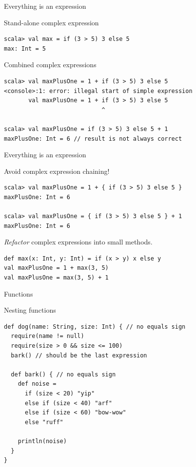 \begin{frame}[fragile]{Everything is an expression}
\begin{exampleblock}{Stand-alone complex expression }
\begin{lstlisting}
scala> val max = if (3 > 5) 3 else 5
max: Int = 5
\end{lstlisting}
\end{exampleblock}
\pause
\begin{alertblock}{Combined complex expressions}
\begin{lstlisting}
scala> val maxPlusOne = 1 + if (3 > 5) 3 else 5
<console>:1: error: illegal start of simple expression
       val maxPlusOne = 1 + if (3 > 5) 3 else 5
                            ^

scala> val maxPlusOne = if (3 > 5) 3 else 5 + 1
maxPlusOne: Int = 6 // result is not always correct
\end{lstlisting}
\end{alertblock}
\end{frame}
\begin{frame}[fragile]{Everything is an expression}
\begin{exampleblock}{\alert{Avoid} complex expression chaining!}
\begin{lstlisting}
scala> val maxPlusOne = 1 + { if (3 > 5) 3 else 5 }
maxPlusOne: Int = 6

scala> val maxPlusOne = { if (3 > 5) 3 else 5 } + 1
maxPlusOne: Int = 6
\end{lstlisting}
\end{exampleblock}
\pause
\begin{exampleblock}{\emph{Refactor} complex expressions into small methods.}
\begin{lstlisting}
def max(x: Int, y: Int) = if (x > y) x else y
val maxPlusOne = 1 + max(3, 5)
val maxPlusOne = max(3, 5) + 1
\end{lstlisting}
\end{exampleblock}
\end{frame}


\begin{frame}[fragile]{Functions}
\begin{alertblock}{Nesting functions}
\begin{lstlisting}
def dog(name: String, size: Int) { // no equals sign
  require(name != null)
  require(size > 0 && size <= 100)
  bark() // should be the last expression

  def bark() { // no equals sign
    def noise =
      if (size < 20) "yip"
      else if (size < 40) "arf"
      else if (size < 60) "bow-wow"
      else "ruff"
        
    println(noise)
  }
}
\end{lstlisting}
\end{alertblock}
\end{frame}


